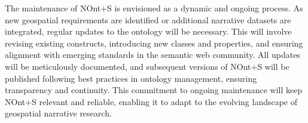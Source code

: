 The maintenance of NOnt+S is envisioned as a dynamic and ongoing process. As new geospatial requirements are identified or additional narrative datasets are integrated, regular updates to the ontology will be necessary. This will involve revising existing constructs, introducing new classes and properties, and ensuring alignment with emerging standards in the semantic web community. All updates will be meticulously documented, and subsequent versions of NOnt+S will be published following best practices in ontology management, ensuring transparency and continuity. This commitment to ongoing maintenance will keep NOnt+S relevant and reliable, enabling it to adapt to the evolving landscape of geospatial narrative research.





